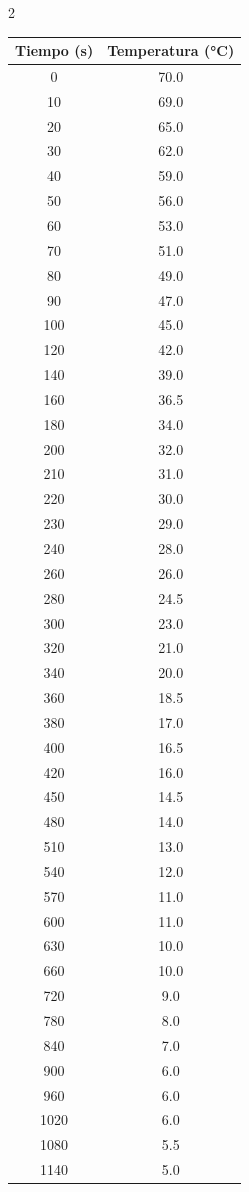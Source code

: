\documentclass[11pt,letterpaper]{article}
\begin{document}
\begin{multicols}{2}
	\begin{tabular}{|c|c|}
		\hline
		\textbf{Tiempo (s)} & \textbf{Temperatura (°C)} \\ \hline
		0    & 70.0 \\ \hline
		10   & 69.0 \\ \hline
		20   & 65.0 \\ \hline
		30   & 62.0 \\ \hline
		40   & 59.0 \\ \hline
		50   & 56.0 \\ \hline
		60   & 53.0 \\ \hline
		70   & 51.0 \\ \hline
		80   & 49.0 \\ \hline
		90   & 47.0 \\ \hline
		100  & 45.0 \\ \hline
		120  & 42.0 \\ \hline
		140  & 39.0 \\ \hline
		160  & 36.5 \\ \hline
		180  & 34.0 \\ \hline
		200  & 32.0 \\ \hline
		210  & 31.0 \\ \hline
		220  & 30.0 \\ \hline
		230  & 29.0 \\ \hline
		240  & 28.0 \\ \hline
		260  & 26.0 \\ \hline
		280  & 24.5 \\ \hline
		300  & 23.0 \\ \hline
		320  & 21.0 \\ \hline
		340  & 20.0 \\ \hline
		360  & 18.5 \\ \hline
		380  & 17.0 \\ \hline
		400  & 16.5 \\ \hline
		420  & 16.0 \\ \hline
		450  & 14.5 \\ \hline
		480  & 14.0 \\ \hline
		510  & 13.0 \\ \hline
		540  & 12.0 \\ \hline
		570  & 11.0 \\ \hline
		600  & 11.0 \\ \hline
		630  & 10.0 \\ \hline
		660  & 10.0 \\ \hline
		720  & 9.0  \\ \hline
		780  & 8.0  \\ \hline
		840  & 7.0  \\ \hline
		900  & 6.0  \\ \hline
		960  & 6.0  \\ \hline
		1020 & 6.0  \\ \hline
		1080 & 5.5  \\ \hline
		1140 & 5.0  \\ \hline
	\end{tabular}


\end{multicols}
\newpage
\end{document}

